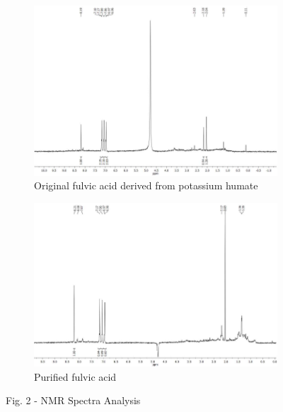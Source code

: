 \begin{figure}[H]
    \centering
    \begin{subfigure}{0.49\textwidth}
        \centering
        \includegraphics[width=\linewidth]{media/chem/image4}
        \caption*{Original fulvic acid derived from potassium humate}
    \end{subfigure}
    \hfill
    \begin{subfigure}{0.49\textwidth}
        \centering
        \includegraphics[width=\linewidth]{media/chem/image5}
        \caption*{Purified fulvic acid}
    \end{subfigure}
    \caption*{Fig. 2 - NMR Spectra Analysis}
\end{figure}

